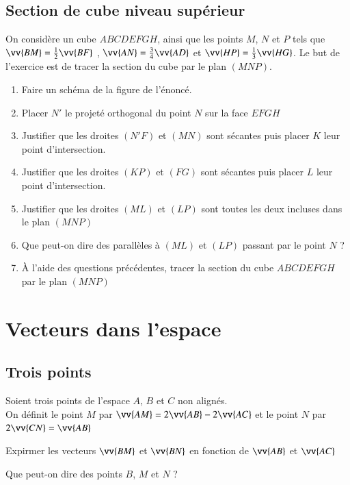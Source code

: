 \documentclass[oneside,12pt]{article}          %
\begin{document}
\subsection{Section de cube niveau supérieur}
On considère un cube $ABCDEFGH$, ainsi que les points $M$, $N$ et $P$ tels que $\vv{BM}=\frac{1}{2}\vv{BF}$ , $\vv{AN}=\frac{3}{4}\vv{AD}$ et $\vv{HP}=\frac{1}{3}\vv{HG}$. Le but de l'exercice est de tracer la section du cube par le plan $(MNP)$.
\begin{enumerate}
    \item Faire un schéma de la figure de l'énoncé.
    \item Placer $N'$ le projeté orthogonal du point $N$ sur la face $EFGH$
    \item Justifier que les droites $(N'F)$ et $(MN)$ sont sécantes puis placer $K$ leur point d'intersection.
    \item Justifier que les droites $(KP)$ et $(FG)$ sont sécantes puis placer $L$ leur point d'intersection.
    \item Justifier que les droites $(ML)$ et $(LP)$ sont toutes les deux incluses dans le plan $(MNP)$
    \item Que peut-on dire des parallèles à $(ML)$ et $(LP)$ passant par le point $N$ ?
    \item À l'aide des questions précédentes, tracer la section du cube $ABCDEFGH$ par le plan $(MNP)$
\end{enumerate}



\section{Vecteurs dans l'espace}

\subsection{Trois points}
Soient trois points de l'espace $A$, $B$ et $C$ non alignés.\\
On définit le point $M$ par $\vv{AM}=2\vv{AB}-2\vv{AC}$ et le point $N$ par $2\vv{CN}=\vv{AB}$

Expirmer les vecteurs $\vv{BM}$ et $\vv{BN}$ en fonction de $\vv{AB}$ et $\vv{AC}$

Que peut-on dire des points $B$, $M$ et $N$ ?
\end{document}
